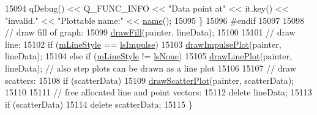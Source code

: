 \begin{DoxyCode}
15094       qDebug() << Q\_FUNC\_INFO << \textcolor{stringliteral}{"Data point at"} << it.key() << \textcolor{stringliteral}{"invalid."} << \textcolor{stringliteral}{"Plottable name:"} << 
      \hyperlink{class_q_c_p_abstract_plottable_a1affc1972938e4364a9325e4e4e4dcea}{name}();
15095   \}
15096 \textcolor{preprocessor}{#endif}
15097 
15098   \textcolor{comment}{// draw fill of graph:}
15099   \hyperlink{class_q_c_p_graph_ad6d07926e6d6b7cfa70258780d47b7a0}{drawFill}(painter, lineData);
15100   
15101   \textcolor{comment}{// draw line:}
15102   \textcolor{keywordflow}{if} (\hyperlink{class_q_c_p_graph_a8604fd98402035a63375849f7341ee25}{mLineStyle} == \hyperlink{class_q_c_p_graph_ad60175cd9b5cac937c5ee685c32c0859aa3b358b4ae7cca94aceeb8e529c12ebb}{lsImpulse})
15103     \hyperlink{class_q_c_p_graph_abc01180629621f1e47e94559227d3d8c}{drawImpulsePlot}(painter, lineData);
15104   \textcolor{keywordflow}{else} \textcolor{keywordflow}{if} (\hyperlink{class_q_c_p_graph_a8604fd98402035a63375849f7341ee25}{mLineStyle} != \hyperlink{class_q_c_p_graph_ad60175cd9b5cac937c5ee685c32c0859aea9591b933733cc7b20786b71e60fa04}{lsNone})
15105     \hyperlink{class_q_c_p_graph_acebc22c3385829b19a87e6281fe6ade2}{drawLinePlot}(painter, lineData); \textcolor{comment}{// also step plots can be drawn as a line plot}
15106   
15107   \textcolor{comment}{// draw scatters:}
15108   \textcolor{keywordflow}{if} (scatterData)
15109     \hyperlink{class_q_c_p_graph_a6bdc385b122ce06134d4196373ae2250}{drawScatterPlot}(painter, scatterData);
15110   
15111   \textcolor{comment}{// free allocated line and point vectors:}
15112   \textcolor{keyword}{delete} lineData;
15113   \textcolor{keywordflow}{if} (scatterData)
15114     \textcolor{keyword}{delete} scatterData;
15115 \}
\end{DoxyCode}


